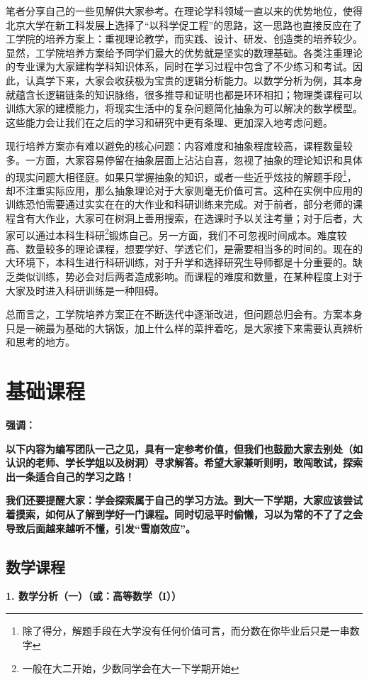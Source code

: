 \documentclass[11pt,oneside]{book}
\begin{document}
笔者分享自己的一些见解供大家参考。在理论学科领域一直以来的优势地位，使得北京大学在新工科发展上选择了“以科学促工程”的思路，这一思路也直接反应在了工学院的培养方案上：重视理论教学，而实践、设计、研发、创造类的培养较少。显然，工学院培养方案给予同学们最大的优势就是坚实的数理基础。各类注重理论的专业课为大家建构学科知识体系，同时在学习过程中包含了不少练习和考试。因此，认真学下来，大家会收获极为宝贵的逻辑分析能力。以数学分析为例，其本身就蕴含长逻辑链条的知识脉络，很多推导和证明也都是环环相扣；物理类课程可以训练大家的建模能力，将现实生活中的复杂问题简化抽象为可以解决的数学模型。这些能力会让我们在之后的学习和研究中更有条理、更加深入地考虑问题。

\vspace{10pt}

现行培养方案亦有难以避免的核心问题：内容难度和抽象程度较高，课程数量较多。一方面，大家容易停留在抽象层面上沾沾自喜，忽视了抽象的理论知识和具体的现实问题大相径庭。如果只掌握抽象的知识，或者一些近乎炫技的解题手段\footnote{除了得分，解题手段在大学没有任何价值可言，而分数在你毕业后只是一串数字}，却不注重实际应用，那么抽象理论对于大家则毫无价值可言。这种在实例中应用的训练恐怕需要通过实实在在的大作业和科研训练来完成。对于前者，部分老师的课程含有大作业，大家可在树洞上善用搜索，在选课时予以关注考量；对于后者，大家可以通过本科生科研\footnote{一般在大二开始，少数同学会在大一下学期开始}锻炼自己。另一方面，我们不可忽视时间成本。难度较高、数量较多的理论课程，想要学好、学透它们，是需要相当多的时间的。现在的大环境下，本科生进行科研训练，对于升学和选择研究生导师都是十分重要的。缺乏类似训练，势必会对后两者造成影响。而课程的难度和数量，在某种程度上对于大家及时进入科研训练是一种阻碍。

总而言之，工学院培养方案正在不断迭代中逐渐改进，但问题总归会有。方案本身只是一碗最为基础的大锅饭，加上什么样的菜拌着吃，是大家接下来需要认真辨析和思考的地方。


\section{基础课程}
\textbf{强调：}

\textbf{以下内容为编写团队一己之见，具有一定参考价值，但我们也鼓励大家去别处（如认识的老师、学长学姐以及树洞）寻求解答。希望大家兼听则明，敢闯敢试，探索出一条适合自己的学习之路！}

\textbf{我们还要提醒大家：学会探索属于自己的学习方法。到大一下学期，大家应该尝试着摸索，如何从了解到学好一门课程。同时切忌平时偷懒，习以为常的不了了之会导致后面越来越听不懂，引发“雪崩效应”。}


\subsection{数学课程}
\textbf{1. 数学分析（一）（或：高等数学（I））}
\end{document}
